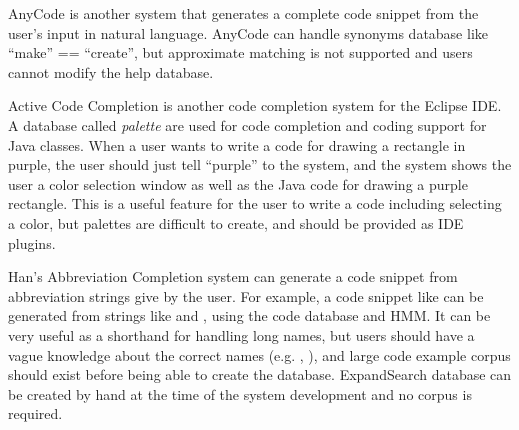 \documentclass[manuscript,anonymous,review]{acmart}
\def\ES{\textsf{ExpandSearch}}
\begin{document}
AnyCode\cite{Gvero:2015:SJE:2814270.2814295} is another system
that generates a complete code snippet from the user's
input in natural language.
AnyCode can handle synonyms database like ``make'' == ``create'',
but approximate matching is not supported and
users cannot modify the help database.



Active Code Completion\cite{Omar:2012:ACC:2337223.2337324}
is another code completion system for the Eclipse IDE.
A database called \textit{palette} are used for code completion and coding support
for Java classes.
When a user wants to write a code for drawing a rectangle in purple,
the user should just tell ``purple'' to the system,
and the system shows the user a color selection window
as well as the Java code for drawing a purple rectangle.
This is a useful feature for the user to write a code including selecting
a color, but palettes are difficult to create, and should be provided
as IDE plugins.

Han's Abbreviation Completion system\cite{Han:2009:CCA:1747491.1747530}
can generate a code snippet from abbreviation strings give by the user.
For example, a code snippet like 
can be generated from strings like
 and , using the code database and HMM.
It can be very useful as a shorthand for handling long names,
but users should have a vague knowledge about the correct names
(e.g. , ),
and large code example corpus should exist before being able to
create the database.
{\ES} database can be created by hand at the time of the system development
and no corpus is required.
\end{document}
